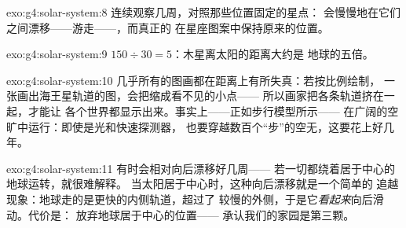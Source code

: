 \begin{solution}{exo:g4:solar-system:8}
连续观察几周，对照那些位置固定的星点：
会慢慢地在它们之间漂移——游走——，而真正的
在星座图案中保持原来的位置。
\end{solution}

\begin{solution}{exo:g4:solar-system:9}
$150 \div 30 = 5$：木星离太阳的距离大约是
地球的五倍。
\end{solution}

\begin{solution}{exo:g4:solar-system:10}
几乎所有的图画都在距离上有所失真：若按比例绘制，
一张画出海王星轨道的图，会把缩成看不见的小点——
所以画家把各条轨道挤在一起，才能让
各个世界都显示出来。事实上——正如步行模型所示——
在广阔的空旷中运行：即使是光和快速探测器，
也要穿越数百个“步”的空无，这要花上好几年。
\end{solution}

\begin{solution}{exo:g4:solar-system:11}
有时会相对向后漂移好几周——
若一切都绕着居于中心的地球运转，就很难解释。
当太阳居于中心时，这种向后漂移就是一个简单的
追越现象：地球走的是更快的内侧轨道，超过了
较慢的外侧，于是它\emph{看起来}向后滑动。代价是：
放弃地球居于中心的位置——
承认我们的家园是第三颗。
\end{solution}
